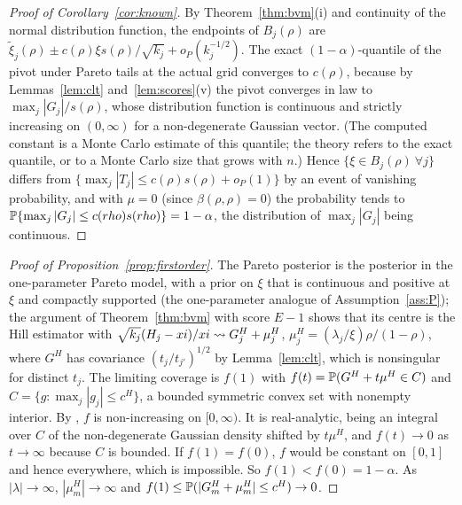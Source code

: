 \begin{proof}[Proof of Corollary~\ref{cor:known}]
By Theorem~\ref{thm:bvm}(i) and continuity of the normal distribution function, the endpoints of
$B_j(\rho)$ are $\tilde\xi_j(\rho)\pm c(\rho)\xi s(\rho)/\sqrt{k_j}+o_P(k_j^{-1/2})$. The
exact $(1-\alpha)$-quantile of the pivot under Pareto tails at the actual grid converges to
$c(\rho)$, because by Lemmas~\ref{lem:clt} and~\ref{lem:scores}(v) the pivot converges in law to $\max_j|G_j|/s(\rho)$, whose
distribution function is continuous and strictly increasing on $(0,\infty)$ for a non-degenerate
Gaussian vector. (The computed constant is a Monte Carlo estimate of this quantile; the theory
refers to the exact quantile, or to a Monte Carlo size that grows with $n$.) Hence $\{\xi\in B_j(\rho)\ \forall j\}$ differs from
$\{\max_j|T_{j}|\le c(\rho)s(\rho)+o_P(1)\}$ by an event of vanishing probability, and with
$\mu=0$ (since $\beta(\rho,\rho)=0$) the probability tends to
$\mathbb{P}\{\max_j|G_j|\le c(rho)s(rho)\}=1-\alpha$, the distribution of $\max_j|G_j|$ being
continuous. \qedhere
\end{proof}

\begin{proof}[Proof of Proposition~\ref{prop:firstorder}]
The Pareto posterior is the posterior in the one-parameter Pareto model, with a prior on $\xi$
that is continuous and positive at $\xi$ and compactly supported (the one-parameter analogue of
Assumption~\ref{ass:P}); the argument of Theorem~\ref{thm:bvm} with score $E-1$ shows that its centre is the Hill estimator with
$\sqrt{k_j}(H_j-xi)/xi\rightsquigarrow G^H_j+\mu^H_j$, $\mu^H_j=(\lambda_j/\xi)\rho/(1-\rho)$, where $G^H$ has
covariance $(t_j/t_{j'})^{1/2}$ by Lemma~\ref{lem:clt}, which is nonsingular for distinct $t_j$.
The limiting coverage is $f(1)$ with $f(t)=\mathbb{P}(G^H+t\mu^H\in C)$ and
$C=\{g:\max_j|g_j|\le c^H\}$, a bounded symmetric convex set with nonempty interior. By
\citet{anderson1955}, $f$ is non-increasing on $[0,\infty)$. It is real-analytic, being an
integral over $C$ of the non-degenerate Gaussian density shifted by $t\mu^H$, and $f(t)\to0$ as $t\to\infty$
because $C$ is bounded. If $f(1)=f(0)$, $f$ would be constant on $[0,1]$ and hence everywhere,
which is impossible. So $f(1)<f(0)=1-\alpha$. As $|\lambda|\to\infty$, $|\mu^H_m|\to\infty$ and
$f(1)\le\mathbb{P}(|G^H_m+\mu^H_m|\le c^H)\to0$. \qedhere
\end{proof}

